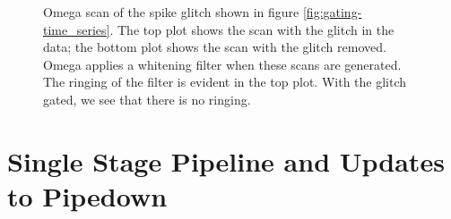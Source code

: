 \begin{figure}[p]
\center
{}
\caption{Omega scan of the spike glitch shown in figure \ref{fig:gating-time_series}. The top plot shows the scan with the glitch in the data; the bottom plot shows the scan with the glitch removed. Omega applies a whitening filter when these scans are generated. The ringing of the filter is evident in the top plot. With the glitch gated, we see that there is no ringing.}
\label{fig:gating-omega_scans}
\end{figure}

\section{Single Stage Pipeline and Updates to Pipedown}


